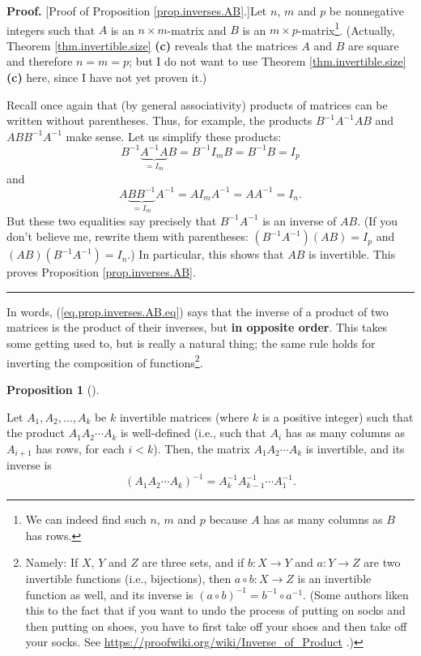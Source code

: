 \documentclass[numbers=enddot,12pt,final,onecolumn,notitlepage]{scrartcl}%
\theoremstyle{definition}
\newtheorem{prop}[theo]{Proposition}
\newenvironment{proposition}[1][]
{\begin{prop}[#1]\begin{leftbar}}
{\end{leftbar}\end{prop}}
\newenvironment{proof}[1][Proof]{\noindent\textbf{#1.} }{\ \rule{0.5em}{0.5em}}
\begin{document}
\begin{proof}
[Proof of Proposition \ref{prop.inverses.AB}.]Let $n$, $m$ and $p$ be
nonnegative integers such that $A$ is an $n\times m$-matrix and $B$ is an
$m\times p$-matrix\footnote{We can indeed find such $n$, $m$ and $p$ because
$A$ has as many columns as $B$ has rows.}. (Actually, Theorem
\ref{thm.invertible.size} \textbf{(c)} reveals that the matrices $A$ and $B$
are square and therefore $n=m=p$; but I do not want to use Theorem
\ref{thm.invertible.size} \textbf{(c)} here, since I have not yet proven it.)

Recall once again that (by general associativity) products of matrices can be
written without parentheses. Thus, for example, the products $B^{-1}A^{-1}AB$
and $ABB^{-1}A^{-1}$ make sense. Let us simplify these products:%
\[
B^{-1}\underbrace{A^{-1}A}_{=I_{m}}B=B^{-1}I_{m}B=B^{-1}B=I_{p}%
\]
and%
\[
A\underbrace{BB^{-1}}_{=I_{m}}A^{-1}=AI_{m}A^{-1}=AA^{-1}=I_{n}.
\]
But these two equalities say precisely that $B^{-1}A^{-1}$ is an inverse of
$AB$. (If you don't believe me, rewrite them with parentheses: $\left(
B^{-1}A^{-1}\right)  \left(  AB\right)  =I_{p}$ and $\left(  AB\right)
\left(  B^{-1}A^{-1}\right)  =I_{n}$.) In particular, this shows that $AB$ is
invertible. This proves Proposition \ref{prop.inverses.AB}.
\end{proof}

In words, (\ref{eq.prop.inverses.AB.eq}) says that the inverse of a product of
two matrices is the product of their inverses, but \textbf{in opposite order}.
This takes some getting used to, but is really a natural thing; the same rule
holds for inverting the composition of functions\footnote{Namely: If $X$, $Y$
and $Z$ are three sets, and if $b:X\rightarrow Y$ and $a:Y\rightarrow Z$ are
two invertible functions (i.e., bijections), then $a\circ b:X\rightarrow Z$ is
an invertible function as well, and its inverse is $\left(  a\circ b\right)
^{-1}=b^{-1}\circ a^{-1}$. (Some authors liken this to the fact that if you
want to undo the process of putting on socks and then putting on shoes, you
have to first take off your shoes and then take off your socks. See
\url{https://proofwiki.org/wiki/Inverse_of_Product} .)}.

\begin{proposition}
\label{prop.inverses.A1Ak}Let $A_{1},A_{2},\ldots,A_{k}$ be $k$ invertible
matrices (where $k$ is a positive integer) such that the product $A_{1}%
A_{2}\cdots A_{k}$ is well-defined (i.e., such that $A_{i}$ has as many
columns as $A_{i+1}$ has rows, for each $i<k$). Then, the matrix $A_{1}%
A_{2}\cdots A_{k}$ is invertible, and its inverse is%
\[
\left(  A_{1}A_{2}\cdots A_{k}\right)  ^{-1}=A_{k}^{-1}A_{k-1}^{-1}\cdots
A_{1}^{-1}.
\]

\end{proposition}
\end{document}
